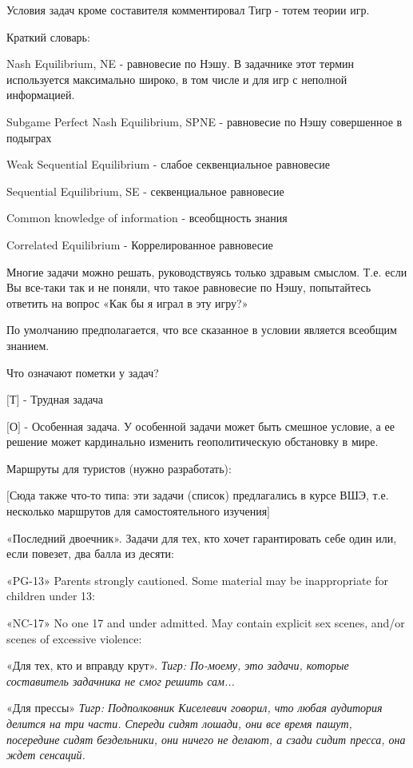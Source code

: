 Условия задач кроме составителя комментировал Тигр - тотем теории игр.\par


Краткий словарь:\par
Nash Equilibrium, NE - равновесие по Нэшу. В задачнике этот термин используется максимально широко, в том числе и для игр с неполной информацией.\par
Subgame Perfect Nash Equilibrium, SPNE - равновесие по Нэшу совершенное в подыграх\par
Weak Sequential Equilibrium - слабое секвенциальное равновесие \par
Sequential Equilibrium, SE - секвенциальное равновесие\par
Common knowledge of information - всеобщность знания\par
Correlated Equilibrium - Коррелированное равновесие\par

Многие задачи можно решать, руководствуясь только здравым смыслом. Т.е. если Вы все-таки так и не поняли, что такое равновесие по Нэшу, попытайтесь ответить на вопрос «Как бы я играл в эту игру?»\par
По умолчанию предполагается, что все сказанное в условии является всеобщим знанием.\par

Что означают пометки у задач?\par
$[$Т$]$ - Трудная задача\par
$[$О$]$ - Особенная задача. У особенной задачи может быть смешное условие, а ее решение может кардинально изменить геополитическую обстановку в мире.




Маршруты для туристов (нужно разработать):

$[$Сюда также что-то типа: эти задачи (список) предлагались в курсе ВШЭ, т.е. несколько маршрутов для самостоятельного изучения$]$

«Последний двоечник». Задачи для тех, кто хочет гарантировать себе один или, если повезет, два балла из десяти:

«PG-13» Parents strongly cautioned. Some material may be inappropriate for children under 13:\par

«NC-17» No one 17 and under admitted. May contain explicit sex scenes, and/or scenes of excessive violence:\par

«Для тех, кто и вправду крут». {\it Тигр:  По-моему, это задачи, которые составитель задачника не смог решить сам...} \par

«Для прессы» {\it Тигр: Подполковник Киселевич говорил, что любая аудитория делится на три части. Спереди сидят лошади, они все время  пашут, посередине сидят бездельники, они ничего не делают, а сзади сидит пресса, она ждет сенсаций.}\par
